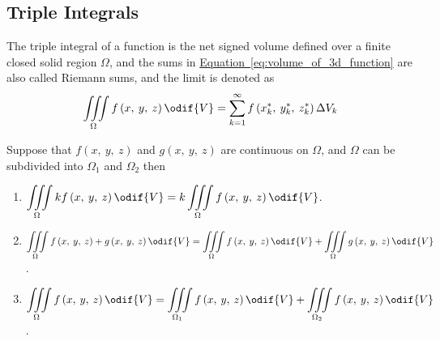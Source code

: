 \documentclass{article}
\begin{document}
\subsection{Triple Integrals}
\begin{definition}
    The triple integral of a function is the net signed volume defined
    over a finite closed solid region \(\Omega\), and the sums in
    \hyperref[eq:volume_of_3d_function]{Equation~\ref{eq:volume_of_3d_function}}
    are also called Riemann sums, and the limit is denoted as
    \begin{equation*}
        \iiint\limits_{\Omega} f\left( x,\: y,\: z \right)  \odif{V}
        = \sum_{k=1}^{\infty} f\left( x_k^\ast,\: y_k^\ast,\: z_k^\ast \right) \Delta V_k
    \end{equation*}
\end{definition}
\begin{tcolorboxlarge}[title={Properties of Triple Integrals}]
    \begin{theorem}
        Suppose that \(f\left( x,\: y,\: z \right) \) and \(g\left( x,\: y,\: z \right)\) are
        continuous on \(\Omega\), and \(\Omega\) can be subdivided into
        \(\Omega_1\) and \(\Omega_2\) then
        \begin{enumerate}[label=\normalfont\alph*)] %
            \item \(\displaystyle\iiint\limits_\Omega kf\left( x,\: y,\: z \right) \odif{V}
                  = k\iiint\limits_\Omega f\left( x,\: y,\: z \right) \odif{V}\).
            \item \(\displaystyle\iiint\limits_\Omega f\left( x,\: y,\: z \right) + g\left( x,\: y,\: z \right) \odif{V}
                  = \iiint\limits_\Omega f\left( x,\: y,\: z \right) \odif{V} + \iiint\limits_\Omega g\left( x,\: y,\: z \right) \odif{V}\).
            \item \(\displaystyle\iiint\limits_\Omega f\left( x,\: y,\: z \right) \odif{V}
                  = \iiint\limits_{\Omega_1} f\left( x,\: y,\: z \right) \odif{V} + \iiint\limits_{\Omega_2} f\left( x,\: y,\: z \right) \odif{V}\).
        \end{enumerate}
    \end{theorem}
\end{tcolorboxlarge}
\newpage
\end{document}
